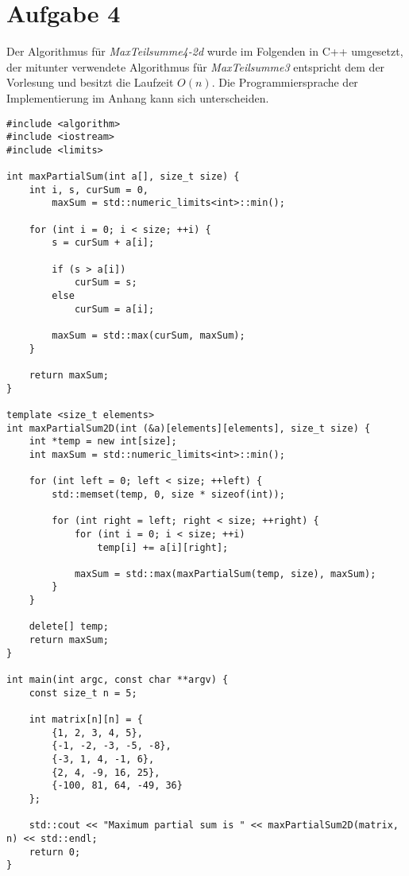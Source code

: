 \section*{Aufgabe 4}
Der Algorithmus für \textit{MaxTeilsumme4-2d} wurde im Folgenden in C++ umgesetzt, der mitunter verwendete Algorithmus für \textit{MaxTeilsumme3} entspricht dem der Vorlesung und besitzt die Laufzeit $O(n)$. Die Programmiersprache der Implementierung im Anhang kann sich unterscheiden. 

\begin{verbatim}
#include <algorithm>
#include <iostream>
#include <limits>

int maxPartialSum(int a[], size_t size) {
	int i, s, curSum = 0,
		maxSum = std::numeric_limits<int>::min();

	for (int i = 0; i < size; ++i) {
		s = curSum + a[i];

		if (s > a[i])
			curSum = s;
		else
			curSum = a[i];

		maxSum = std::max(curSum, maxSum);
	}

	return maxSum;
}

template <size_t elements>
int maxPartialSum2D(int (&a)[elements][elements], size_t size) {
	int *temp = new int[size];
	int maxSum = std::numeric_limits<int>::min();

	for (int left = 0; left < size; ++left) {
		std::memset(temp, 0, size * sizeof(int));

		for (int right = left; right < size; ++right) {
			for (int i = 0; i < size; ++i)
				temp[i] += a[i][right];

			maxSum = std::max(maxPartialSum(temp, size), maxSum);
		}
	}
	
    delete[] temp;
	return maxSum;
}

int main(int argc, const char **argv) {
	const size_t n = 5;

	int matrix[n][n] = {
		{1, 2, 3, 4, 5}, 
        {-1, -2, -3, -5, -8}, 
        {-3, 1, 4, -1, 6}, 
        {2, 4, -9, 16, 25},
		{-100, 81, 64, -49, 36}
	};

	std::cout << "Maximum partial sum is " << maxPartialSum2D(matrix, n) << std::endl;
	return 0;
}

\end{verbatim}
